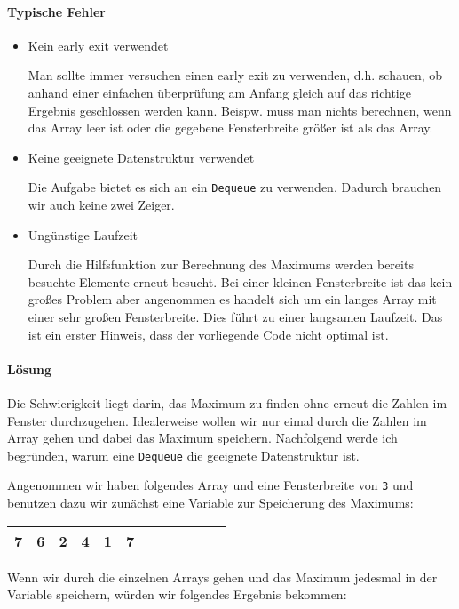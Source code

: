 \documentclass{book}
\begin{document}
\paragraph{Typische Fehler}
\begin{itemize} 
	\item Kein early exit verwendet
	
	Man sollte immer versuchen einen early exit zu verwenden, d.h. schauen, ob anhand einer einfachen überprüfung am Anfang gleich auf das richtige Ergebnis geschlossen werden kann. Beispw. muss man nichts berechnen, wenn das Array leer ist oder die gegebene Fensterbreite größer ist als das Array.
	
	\item Keine geeignete Datenstruktur verwendet
	
	Die Aufgabe bietet es sich an ein \lstinline|Dequeue| zu verwenden. Dadurch brauchen wir auch keine zwei Zeiger.
	
	\item Ungünstige Laufzeit
	
	Durch die Hilfsfunktion zur Berechnung des Maximums werden bereits besuchte Elemente erneut besucht. Bei einer kleinen Fensterbreite ist das kein großes Problem aber angenommen es handelt sich um ein langes Array mit einer sehr großen Fensterbreite. Dies führt zu einer langsamen Laufzeit. Das ist ein erster Hinweis, dass der vorliegende Code nicht optimal ist.

\end{itemize}

\paragraph{Lösung}
Die Schwierigkeit liegt darin, das Maximum zu finden ohne erneut die Zahlen im Fenster durchzugehen. Idealerweise wollen wir nur eimal durch die Zahlen im Array gehen und dabei das Maximum speichern. Nachfolgend werde ich begründen, warum eine \lstinline|Dequeue| die geeignete Datenstruktur ist.

Angenommen wir haben folgendes Array und eine Fensterbreite von \lstinline|3| und benutzen dazu wir zunächst eine Variable zur Speicherung des Maximums:

\begin{tabular}{|l|l|l|l|l|l|l|l|l|l|l|l|} 
	\hline
	7 & 6 & 2 & 4 & 1 & 7\\
	\hline
\end{tabular}

Wenn wir durch die einzelnen Arrays gehen und das Maximum jedesmal in der Variable speichern, würden wir folgendes Ergebnis bekommen:
\end{document}
